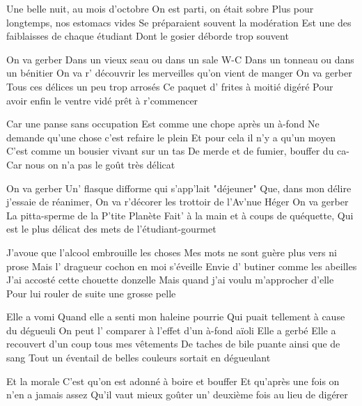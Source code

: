 \footnotemark [
ititle={On va gerber},
tu={On va s'aimer (M : Gilbert Montagné, P : Smetje)}]


\beginverse
Une belle nuit, au mois d'octobre
On est parti, on était sobre
Plus pour longtemps, nos estomacs vides
Se préparaient souvent la modération
Est une des faiblaisses de chaque étudiant
Dont le gosier déborde trop souvent
\endverse

\beginchorus
On va gerber
Dans un vieux seau ou dans un sale W-C
Dans un tonneau ou dans un bénitier
On va r' découvrir les merveilles qu'on vient de manger
On va gerber
Tous ces délices un peu trop arrosés
Ce paquet d' frites à moitié digéré
Pour avoir enfin le ventre  vidé prêt à r'commencer
\endchorus

\beginverse
Car une panse sans occupation
Est comme une chope après un à-fond
Ne demande qu'une chose c'est refaire le plein
Et pour cela il n'y a qu'un moyen
C'est comme un bousier vivant sur un tas
De merde et de fumier, bouffer du ca-
Car nous on n'a pas le goût très délicat
\endverse

\beginchorus
On va gerber
Un' flasque difforme qui s'app'lait "déjeuner"
Que, dans mon délire j'essaie de réanimer,
On va r'décorer les trottoir de l'Av'nue Héger
On va gerber
La pitta-sperme de la P'tite Planète
Fait' à la main et à coups de quéquette,
Qui est le plus délicat des mets de l'étudiant-gourmet
\endchorus

\beginverse
J'avoue que l'alcool embrouille les choses
Mes mots ne sont guère plus vers ni prose
Mais l' dragueur cochon en moi s'éveille
Envie d' butiner comme les abeilles
J'ai accosté cette chouette donzelle
Mais quand j'ai voulu m'approcher d'elle
Pour lui rouler de suite une grosse pelle
\endverse

\beginchorus
Elle a vomi
Quand elle a senti mon haleine pourrie
Qui puait tellement à cause du dégueuli
On peut l' comparer à l'effet d'un à-fond aïoli
Elle a gerbé
Elle a recouvert d'un coup tous mes vêtements
De taches de bile puante ainsi que de sang
Tout un éventail de belles couleurs sortait en dégueulant
\endchorus

\beginchorus
Et la morale
C'est qu'on est adonné à boire et bouffer
Et qu'après une fois on n'en a jamais assez
Qu'il vaut mieux goûter un' deuxième fois au lieu de digérer
\endchorus
\endsong
